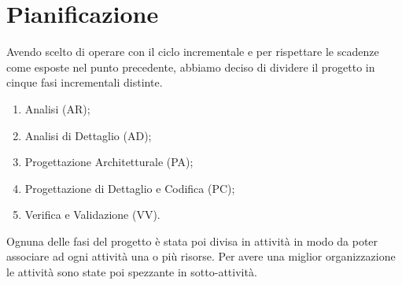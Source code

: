 \newpage
\section{Pianificazione}
\label{4.0}
Avendo scelto di operare con il ciclo incrementale e per rispettare le scadenze come esposte nel punto precedente, abbiamo deciso di dividere il progetto in cinque fasi incrementali distinte.

\begin{enumerate}
\item Analisi (AR);
\item Analisi di Dettaglio (AD);
\item Progettazione Architetturale (PA);
\item Progettazione di Dettaglio e Codifica (PC);
\item Verifica e Validazione (VV).
\end{enumerate}

Ognuna delle fasi del progetto è stata poi divisa in attività in modo da poter associare ad ogni attività una o più risorse. Per avere una miglior organizzazione le attività sono state poi spezzante in sotto-attività. 

\newpage


\newpage


\newpage


\newpage


\newpage


\newpage


\newpage


